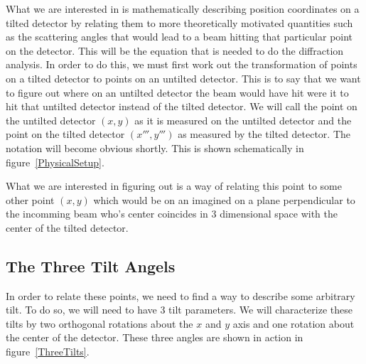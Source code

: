 \begin{SCfigure}
\centering

\caption{This diagram illustrates how tilted geometries 
allow for the collection of diffraction data at more 
extreme angles without the need for a larger detector.}
\label{HigherQValues}
\end{SCfigure}

What we are interested in is mathematically describing 
position coordinates on a tilted detector by relating 
them to more theoretically motivated quantities such as 
the scattering angles that would lead to a beam hitting
that particular point on the detector. This will be 
the equation that is needed to do the diffraction 
analysis. In order to do this, we must first work
out the transformation of points on a tilted detector
to points on an untilted detector. This is to say
that we want to figure out where on an untilted 
detector the beam would have hit were it to hit
that untilted detector instead of the tilted detector.
We will call the point on the untilted detector
$(x,y)$ as it is measured on the untilted detector
and the point on the tilted detector
$(x''',y''')$ as measured by the tilted detector. 
The notation will become obvious
shortly. This is shown schematically in 
figure~\ref{PhysicalSetup}.


\begin{SCfigure}
\centering

\caption{The setup of the experiment. Here, the detector 
is titled by some arbitrary angle with respect to the 
incoming beam. We will call some arbitrary point on 
the tilted detector as $(x''',y''')$. We are interested in 
relating this point to the point $(x,y)$ on some imagined 
untilted detector where a scattered beam would have hit 
were that tilted detector set up instead of the tilted
detector.}
\label{PhysicalSetup}
\end{SCfigure}

What we are interested in figuring out is a way of relating 
this point to some other point $(x,y)$ which would be on an 
imagined on a plane perpendicular to the incomming beam 
who's center coincides in 3 dimensional space with the 
center of the tilted detector.

\subsection{The Three Tilt Angels}
\index{$\alpha$}\index{$\beta$}
In order to relate these points, we need to find a way to 
describe some arbitrary tilt. To do so, we will need to 
have 3 tilt parameters. We will characterize these tilts 
by two orthogonal rotations about the $x$ and $y$ axis 
and one rotation about the center of the detector. These 
three angles are shown in action in figure~\ref{ThreeTilts}.

